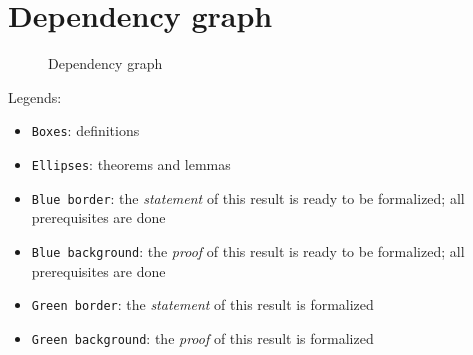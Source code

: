 \section{Dependency graph}

\begin{figure}[H]
    \centering
    {
    \begin{dot2tex}[dot,file=dep_graph_src]
    \end{dot2tex}
    }
    \caption{Dependency graph}
    \label{fig:dep_graph}
    \end{figure}

Legends:

\begin{itemize}
    \item \texttt{Boxes}: definitions
    \item \texttt{Ellipses}: theorems and lemmas
    \item \texttt{Blue border}: the \emph{statement} of this result is ready to be formalized; all prerequisites are done
    \item \texttt{Blue background}: the \emph{proof} of this result is ready to be formalized; all prerequisites are done
    \item \texttt{Green border}:  the \emph{statement} of this result is formalized
    \item \texttt{Green background}: the \emph{proof} of this result is formalized
\end{itemize}